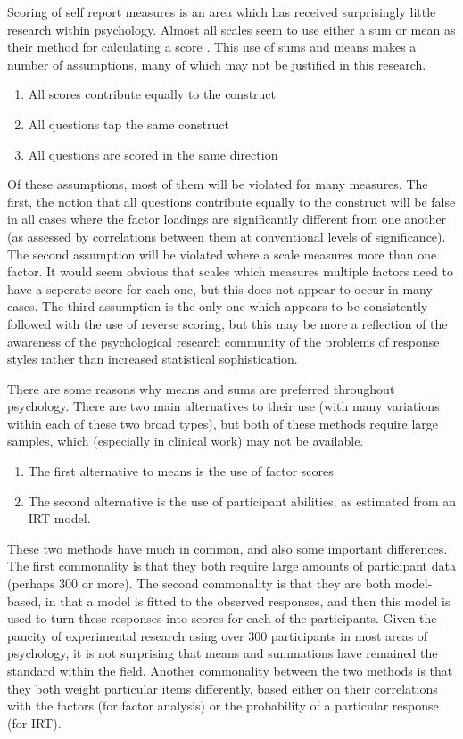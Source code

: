 Scoring of self report measures is an area which has received surprisingly little research within psychology. Almost all scales seem to use either a sum or mean as their method for calculating a score \cite{borsboom2006attack}. This use of sums and means makes a number of assumptions, many of which may not be justified in this research.

\begin{enumerate}
\item All scores contribute equally to the construct
\item All questions tap the same construct
\item All questions are scored in the same direction
\end{enumerate}

Of these assumptions, most of them will be violated for many measures. The first, the notion that all questions contribute equally to the construct will be false in all cases where the factor loadings are significantly different from one another (as assessed by correlations between them at conventional levels of significance). The second assumption will be violated where a scale measures more than one factor. It would seem obvious that scales which measures multiple factors need to have a seperate score for each one, but this does not appear to occur in many cases. The third assumption is the only one which appears to be consistently followed with the use of reverse scoring, but this may be more a reflection of the awareness of the psychological research community of the problems of response styles rather than increased statistical sophistication.

There are some reasons why means and sums are preferred throughout psychology. There are two main alternatives to their use (with many variations within each of these two broad types), but both of these methods require large samples, which (especially in clinical work) may not be available. 
\begin{enumerate}
\item The first alternative to means is the use of factor scores

\item The second alternative is the use of participant abilities, as estimated from an IRT model.
\end{enumerate}

These two methods have much in common, and also some important differences. The first commonality is that they both require large amounts of participant data (perhaps 300 or more)\cite{van1997handbook,henson2006use}. The second commonality is that they are both model-based, in that a model is fitted to the observed responses, and then this model is used to turn these responses into scores for each of the participants. Given the paucity of experimental research using over 300 participants in most areas of psychology, it is not surprising that means and summations have remained the standard within the field. Another commonality between the two methods is that they both weight particular items differently, based either on their correlations with the factors (for factor analysis) or the probability of a particular response (for IRT). 

